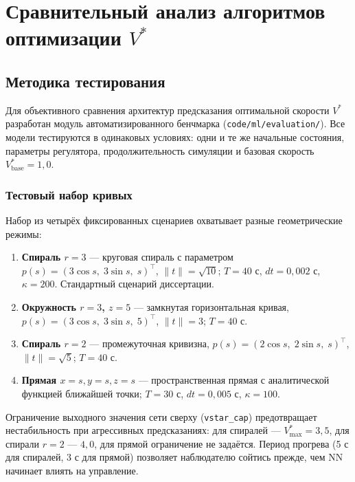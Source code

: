 
\section{Сравнительный анализ алгоритмов оптимизации $V^*$}

\subsection{Методика тестирования}

Для объективного сравнения архитектур предсказания оптимальной скорости $V^*$ разработан модуль автоматизированного бенчмарка (\texttt{code/ml/evaluation/}).
Все модели тестируются в одинаковых условиях: одни и те же начальные состояния, параметры регулятора, продолжительность симуляции и базовая скорость $V^*_{\text{base}} = 1{,}0$.

\subsubsection*{Тестовый набор кривых}

Набор из четырёх фиксированных сценариев охватывает разные геометрические режимы:

\begin{enumerate}
    \item \textbf{Спираль $r{=}3$} — круговая спираль с параметром $p(s) = (3\cos s,\;3\sin s,\;s)^\top$, $\|t\| = \sqrt{10}$; $T{=}40$ с, $dt{=}0{,}002$ с, $\kappa{=}200$. Стандартный сценарий диссертации.
    \item \textbf{Окружность $r{=}3$, $z{=}5$} — замкнутая горизонтальная кривая, $p(s) = (3\cos s,\;3\sin s,\;5)^\top$, $\|t\|{=}3$; $T{=}40$ с.
    \item \textbf{Спираль $r{=}2$} — промежуточная кривизна, $p(s) = (2\cos s,\;2\sin s,\;s)^\top$, $\|t\| = \sqrt{5}$; $T{=}40$ с.
    \item \textbf{Прямая $x{=}s,y{=}s,z{=}s$} — пространственная прямая с аналитической функцией ближайшей точки; $T{=}30$ с, $dt{=}0{,}005$ с, $\kappa{=}100$.
\end{enumerate}

Ограничение выходного значения сети сверху (\texttt{vstar\_cap}) предотвращает нестабильность при агрессивных предсказаниях: для спиралей — $V^*_{\max} = 3{,}5$, для спирали $r{=}2$ — $4{,}0$, для прямой ограничение не задаётся.
Период прогрева (5 с для спиралей, 3 с для прямой) позволяет наблюдателю сойтись прежде, чем NN начинает влиять на управление.

